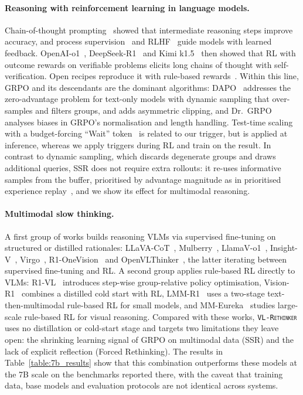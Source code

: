 \documentclass{article}
\newcommand{\model}{\texttt{\textsc{VL-Rethinker}}\xspace}
\begin{document}
\paragraph{Reasoning with reinforcement learning in language models.} Chain-of-thought prompting~\citep{wei2022chain} showed that intermediate reasoning steps improve accuracy, and process supervision~\citep{letsverify} and RLHF~\citep{instructgpt} guide models with learned feedback. OpenAI-o1~\citep{openai-o1}, DeepSeek-R1~\citep{deepseek-r1} and Kimi k1.5~\citep{kimi-1_5} then showed that RL with outcome rewards on verifiable problems elicits long chains of thought with self-verification. Open recipes reproduce it with rule-based rewards~\citep{simplerl,open-reasoner-zero,deepscaler2025,lightr1}. Within this line, GRPO and its descendants are the dominant algorithms: DAPO~\citep{dapo} addresses the zero-advantage problem for text-only models with dynamic sampling that over-samples and filters groups, and adds asymmetric clipping, and Dr.\ GRPO~\citep{drgrpo} analyses biases in GRPO's normalisation and length handling. Test-time scaling with a budget-forcing ``Wait'' token~\citep{s1} is related to our trigger, but is applied at inference, whereas we apply triggers during RL and train on the result. In contrast to dynamic sampling, which discards degenerate groups and draws additional queries, SSR does not require extra rollouts: it re-uses informative samples from the buffer, prioritised by advantage magnitude as in prioritised experience replay~\citep{per}, and we show its effect for multimodal reasoning.

\paragraph{Multimodal slow thinking.} A first group of works builds reasoning VLMs via supervised fine-tuning on structured or distilled rationales: LLaVA-CoT~\citep{llavacot}, Mulberry~\citep{Mulberry}, LlamaV-o1~\citep{llamav_o1}, Insight-V~\citep{insight_v}, Virgo~\citep{virgo}, R1-OneVision~\citep{R1OneVision} and OpenVLThinker~\citep{OpenVLThinker}, the latter iterating between supervised fine-tuning and RL. A second group applies rule-based RL directly to VLMs: R1-VL~\citep{r1vl} introduces step-wise group-relative policy optimisation, Vision-R1~\citep{vision-r1} combines a distilled cold start with RL, LMM-R1~\citep{lmm-r1} uses a two-stage text-then-multimodal rule-based RL for small models, and MM-Eureka~\citep{mmeureka} studies large-scale rule-based RL for visual reasoning. Compared with these works, \model uses no distillation or cold-start stage and targets two limitations they leave open: the shrinking learning signal of GRPO on multimodal data (SSR) and the lack of explicit reflection (Forced Rethinking). The results in Table~\ref{table:7b_results} show that this combination outperforms these models at the 7B scale on the benchmarks reported there, with the caveat that training data, base models and evaluation protocols are not identical across systems.
\end{document}
